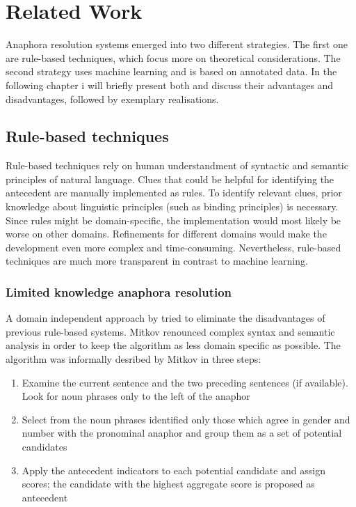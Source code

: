 \chapter{Related Work}
\label{sec:Related Work}

Anaphora resolution systems emerged into two different strategies. The first one are rule-based techniques, which focus more on theoretical considerations. The second strategy uses machine learning and is based on annotated data. In the following chapter i will briefly present both and discuss their advantages and disadvantages, followed by exemplary realisations.

\section{Rule-based techniques}

Rule-based techniques rely on human understandment of syntactic and semantic principles of natural language. Clues that could be helpful for identifying the antecedent are manually implemented as rules. To identify relevant clues, prior knowledge about linguistic principles (such as binding principles) is necessary. Since rules might be domain-specific, the implementation would most likely be worse on other domains. Refinements for different domains would make the development even more complex and time-consuming. Nevertheless, rule-based techniques are much more transparent in contrast to machine learning.

\subsection{Limited knowledge anaphora resolution}

A domain independent approach by \citep{mitkov1998robust}  tried to eliminate the disadvantages of previous rule-based systems. Mitkov renounced complex syntax and semantic analysis in order to keep the algorithm as less domain specific as possible. The algorithm was informally desribed by Mitkov in three steps:
\begin{enumerate} 
\item Examine the current sentence and the two preceding sentences (if available). Look for noun phrases only to the left of the anaphor
\item Select from the noun phrases identified only those which agree in gender and number with the pronominal anaphor and group them as a set of potential candidates
\item Apply the antecedent indicators to each potential candidate and assign scores; the candidate with the highest aggregate score is proposed as antecedent
\end{enumerate}


